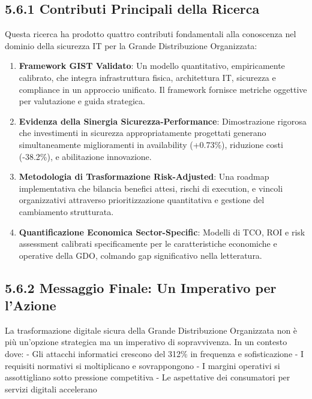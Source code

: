 \documentclass[12pt,a4paper,oneside]{book}
\numberwithin{figure}{chapter} %
\numberwithin{table}{chapter}  %
\begin{document}
\subsection{5.6.1 Contributi Principali della
Ricerca}\label{contributi-principali-della-ricerca}

Questa ricerca ha prodotto quattro contributi fondamentali alla
conoscenza nel dominio della sicurezza IT per la Grande Distribuzione
Organizzata:

\begin{enumerate}
\def\labelenumi{\arabic{enumi}.}
\item
  \textbf{Framework GIST Validato}: Un modello quantitativo,
  empiricamente calibrato, che integra infrastruttura fisica,
  architettura IT, sicurezza e compliance in un approccio unificato. Il
  framework fornisce metriche oggettive per valutazione e guida
  strategica.
\item
  \textbf{Evidenza della Sinergia Sicurezza-Performance}: Dimostrazione
  rigorosa che investimenti in sicurezza appropriatamente progettati
  generano simultaneamente miglioramenti in availability (+0.73\%),
  riduzione costi (-38.2\%), e abilitazione innovazione.
\item
  \textbf{Metodologia di Trasformazione Risk-Adjusted}: Una roadmap
  implementativa che bilancia benefici attesi, rischi di execution, e
  vincoli organizzativi attraverso prioritizzazione quantitativa e
  gestione del cambiamento strutturata.
\item
  \textbf{Quantificazione Economica Sector-Specific}: Modelli di TCO,
  ROI e risk assessment calibrati specificamente per le caratteristiche
  economiche e operative della GDO, colmando gap significativo nella
  letteratura.
\end{enumerate}

\subsection{5.6.2 Messaggio Finale: Un Imperativo per
l'Azione}\label{messaggio-finale-un-imperativo-per-lazione}

La trasformazione digitale sicura della Grande Distribuzione Organizzata
non è più un'opzione strategica ma un imperativo di sopravvivenza. In un
contesto dove: - Gli attacchi informatici crescono del 312\% in
frequenza e sofisticazione - I requisiti normativi si moltiplicano e
sovrappongono - I margini operativi si assottigliano sotto pressione
competitiva - Le aspettative dei consumatori per servizi digitali
accelerano
\end{document}
